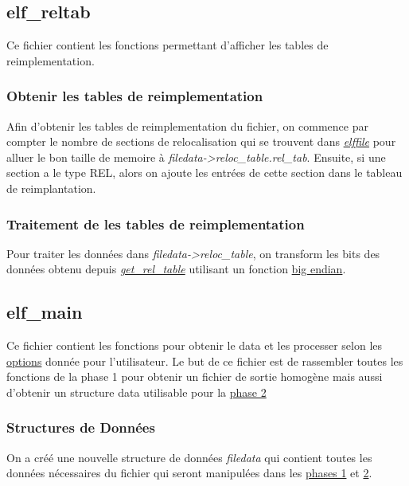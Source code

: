 \documentclass[a4paper]{article} %
\begin{document}

\subsection{elf\_reltab}
\label{sec:relocation}
\noindent Ce fichier contient les fonctions permettant d'afficher les tables de 
reimplementation.

\subsubsection*{Obtenir les tables de reimplementation}
\label{sec:getreltab}
Afin d'obtenir les tables de reimplementation du fichier, on commence par compter 
le nombre de sections de relocalisation qui se trouvent dans \hyperref[sec:elffile]{\textit{elffile}} pour alluer 
le bon taille de memoire à \textit{filedata->reloc\_table.rel\_tab}. Ensuite, si une 
section a le type REL, alors on ajoute les entrées de cette section dans le tableau de 
reimplantation.

\subsubsection*{Traitement de les tables de reimplementation}
Pour traiter les données dans \textit{filedata->reloc\_table}, on transform 
les bits des données obtenu depuis \hyperref[sec:getreltab]{\textit{get\_rel\_table}}
utilisant un fonction \hyperref[sec:endian]{big endian}. 


\subsection{elf\_main}
\noindent Ce fichier contient les fonctions pour obtenir le data et les processer 
selon les \hyperref[sec:options]{options} donnée pour l'utilisateur. Le but de ce 
fichier est de rassembler toutes les fonctions de la phase 1 pour obtenir un fichier 
de sortie homogène mais aussi d'obtenir un structure data utilisable pour la 
\hyperref[sec:phase2]{phase 2} 

\subsubsection*{Structures de Données}
\label{sec:filedata}

On a créé une nouvelle structure de données \textit{filedata} qui contient 
toutes les données nécessaires du fichier qui seront manipulées dans les \hyperref[sec:phase1]{phases 1} 
et \hyperref[sec:phase2]{2}. 
\end{document}
